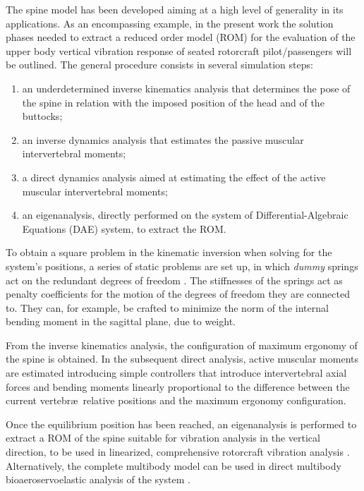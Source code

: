 The spine model has been developed aiming at a high level of generality in its
applications.  As an encompassing example, in the present work the solution
phases needed to extract a reduced order model (ROM) for the evaluation of the
upper body vertical vibration response of seated rotorcraft pilot/passengers
will be outlined. The general procedure consists in several simulation steps: 

\begin{enumerate}
  \item an underdetermined inverse kinematics analysis that determines the pose
    of the spine in relation with the imposed position of the head and of the
    buttocks;
  \vspace{-0.2em}
  \item an inverse dynamics analysis that estimates the passive muscular
    intervertebral moments;
    \vspace{-0.2em}
  \item a direct dynamics analysis aimed at estimating the effect of the active
    muscular intervertebral moments;
    \vspace{-0.2em}
  \item an eigenanalysis, directly performed on the system of Differential-Algebraic Equations (DAE) system, to extract the ROM.
\end{enumerate}

To obtain a square problem in the kinematic inversion when solving for the 
system's positions, a series of static problems are set up, in which \emph{dummy} springs
act on the redundant degrees of freedom \cite{IK:FumagalliASME}. The
stiffnesses of the springs act as penalty coefficients for the motion of the degrees of 
freedom they are connected to. They can, for example, be crafted to minimize the norm 
of the internal bending moment in the sagittal plane, due to weight.

From the inverse kinematics analysis, the configuration of maximum ergonomy 
of the spine is obtained. In the subsequent direct analysis, active muscular
moments are estimated introducing simple controllers that
introduce intervertebral axial forces and bending moments linearly proportional
to the difference between the current vertebr\ae\ relative positions and the 
maximum ergonomy configuration.

Once the equilibrium position has been reached, an eigenanalysis is performed 
to extract a ROM \cite{RIPEPI-2011} of the spine suitable for vibration analysis
in the vertical direction, to be used in linearized, 
comprehensive rotorcraft vibration analysis \cite{TAMER-2017-ERF}.
Alternatively, the complete multibody model can be used in direct multibody 
bioaeroservoelastic analysis of the system \cite{MASARATI-2015-ERF}.
